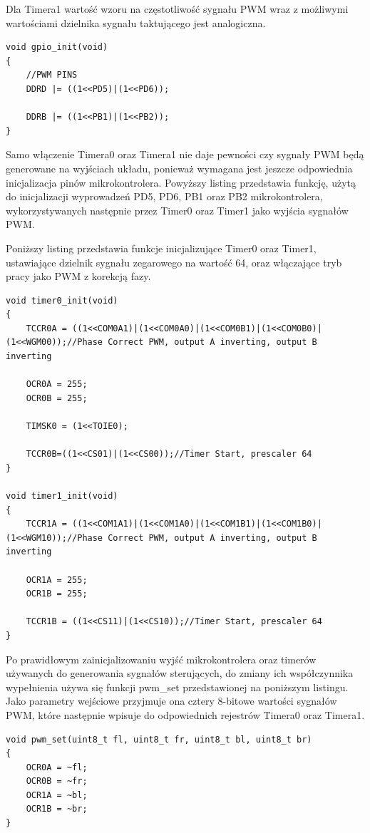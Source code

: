 Dla Timera1 wartość wzoru na częstotliwość sygnału PWM wraz z możliwymi wartościami dzielnika sygnału taktującego jest analogiczna.

\begin{lstlisting}
void gpio_init(void)
{
	//PWM PINS
	DDRD |= ((1<<PD5)|(1<<PD6));

	DDRB |= ((1<<PB1)|(1<<PB2));
}
\end{lstlisting}

Samo włączenie Timera0 oraz Timera1 nie daje pewności czy sygnały PWM będą generowane na wyjściach układu, ponieważ wymagana jest jeszcze odpowiednia inicjalizacja pinów mikrokontrolera. Powyższy listing przedstawia funkcję, użytą do inicjalizacji wyprowadzeń PD5, PD6, PB1 oraz PB2 mikrokontrolera, wykorzystywanych następnie przez Timer0 oraz Timer1 jako wyjścia sygnałów PWM. 


Poniższy listing przedstawia funkcje inicjalizujące Timer0 oraz Timer1, ustawiające dzielnik sygnału zegarowego na wartość 64, oraz włączające tryb pracy jako PWM z korekcją fazy.

\begin{lstlisting}
void timer0_init(void)
{
	TCCR0A = ((1<<COM0A1)|(1<<COM0A0)|(1<<COM0B1)|(1<<COM0B0)|(1<<WGM00));//Phase Correct PWM, output A inverting, output B inverting

	OCR0A = 255;
	OCR0B = 255;

	TIMSK0 = (1<<TOIE0);

	TCCR0B=((1<<CS01)|(1<<CS00));//Timer Start, prescaler 64
}

void timer1_init(void)
{
	TCCR1A = ((1<<COM1A1)|(1<<COM1A0)|(1<<COM1B1)|(1<<COM1B0)|(1<<WGM10));//Phase Correct PWM, output A inverting, output B inverting

	OCR1A = 255;
	OCR1B = 255;

	TCCR1B = ((1<<CS11)|(1<<CS10));//Timer Start, prescaler 64
}
\end{lstlisting}




Po prawidłowym zainicjalizowaniu wyjść mikrokontrolera oraz timerów używanych do generowania sygnałów sterujących, do zmiany ich współczynnika wypełnienia używa się funkcji pwm\_set przedstawionej na poniższym listingu. Jako parametry wejściowe przyjmuje ona cztery 8-bitowe wartości sygnałów PWM, które następnie wpisuje do odpowiednich rejestrów Timera0 oraz Timera1.

\begin{lstlisting}
void pwm_set(uint8_t fl, uint8_t fr, uint8_t bl, uint8_t br)
{
	OCR0A = ~fl;
	OCR0B = ~fr;
	OCR1A = ~bl;
	OCR1B = ~br;
}
\end{lstlisting}



